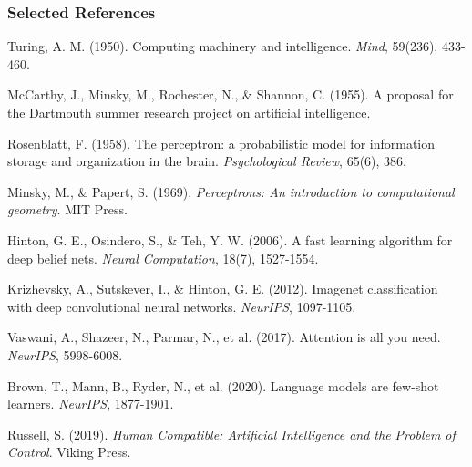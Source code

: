 \documentclass{beamer}
\begin{document}
\begin{frame}
    \frametitle{Selected References}
    \scriptsize
    \begin{thebibliography}{99}
         Turing, A. M. (1950). Computing machinery and intelligence. \textit{Mind}, 59(236), 433-460.
        
         McCarthy, J., Minsky, M., Rochester, N., \& Shannon, C. (1955). A proposal for the Dartmouth summer research project on artificial intelligence.
        
         Rosenblatt, F. (1958). The perceptron: a probabilistic model for information storage and organization in the brain. \textit{Psychological Review}, 65(6), 386.
        
         Minsky, M., \& Papert, S. (1969). \textit{Perceptrons: An introduction to computational geometry}. MIT Press.
        
         Hinton, G. E., Osindero, S., \& Teh, Y. W. (2006). A fast learning algorithm for deep belief nets. \textit{Neural Computation}, 18(7), 1527-1554.
        
         Krizhevsky, A., Sutskever, I., \& Hinton, G. E. (2012). Imagenet classification with deep convolutional neural networks. \textit{NeurIPS}, 1097-1105.
        
         Vaswani, A., Shazeer, N., Parmar, N., et al. (2017). Attention is all you need. \textit{NeurIPS}, 5998-6008.
        
         Brown, T., Mann, B., Ryder, N., et al. (2020). Language models are few-shot learners. \textit{NeurIPS}, 1877-1901.
        
         Russell, S. (2019). \textit{Human Compatible: Artificial Intelligence and the Problem of Control}. Viking Press.
    \end{thebibliography}
\end{frame}
\end{document}
